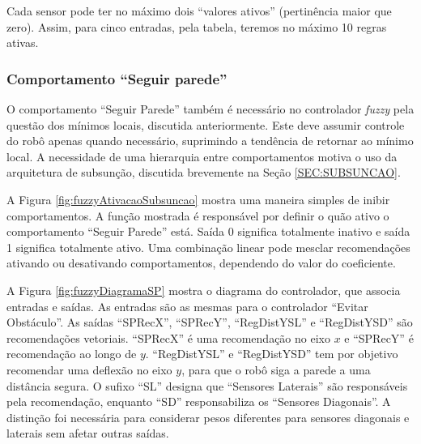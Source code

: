 	
	
	Cada sensor pode ter no máximo dois ``valores ativos'' (pertinência maior que zero). Assim,
	para cinco entradas, pela tabela, teremos no máximo 10 regras ativas. 
	 
	\subsubsection{Comportamento ``Seguir parede''}

	O comportamento ``Seguir Parede'' também é necessário no controlador \textit{fuzzy} pela 
	questão dos mínimos locais, discutida anteriormente. Este deve assumir controle do robô 
	apenas quando necessário, suprimindo a tendência de retornar ao mínimo local. A necessidade 
	de uma hierarquia entre comportamentos motiva o uso da arquitetura de subsunção, discutida 
	brevemente na Seção \ref{SEC:SUBSUNCAO}.
	
	A Figura \ref{fig:fuzzyAtivacaoSubsuncao} mostra uma maneira simples de inibir 
	comportamentos. A função mostrada é responsável por definir o quão ativo o comportamento 
	``Seguir Parede'' está. Saída 0 significa totalmente inativo e saída 1 significa totalmente
	ativo. Uma combinação linear pode mesclar recomendações ativando ou desativando 
	comportamentos, dependendo do valor do coeficiente. 
	
	
	
	A Figura \ref{fig:fuzzyDiagramaSP} mostra o diagrama do controlador, que associa entradas 
	e saídas. As entradas são as mesmas para o controlador ``Evitar Obstáculo''. As saídas
	``SPRecX'', ``SPRecY'', ``RegDistYSL'' e ``RegDistYSD'' são recomendações vetoriais. 
	``SPRecX'' é uma recomendação no eixo $x$ e ``SPRecY'' é recomendação ao longo de $y$. 
	``RegDistYSL'' e ``RegDistYSD'' tem por objetivo recomendar uma deflexão no eixo $y$, para
	que o robô siga a parede a uma distância segura. O sufixo ``SL'' designa que ``Sensores 
	Laterais'' são responsáveis pela recomendação, enquanto ``SD'' responsabiliza os 
	``Sensores Diagonais''. A distinção foi necessária para considerar pesos diferentes para
	sensores diagonais e laterais sem afetar outras saídas.
	
	
	
